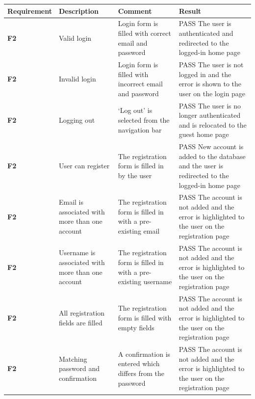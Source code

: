 \begin{longtabu} to \textwidth {XXXX}
\hline
Requirement & Description & Comment & Result \\ 
\hline
\textbf{F2} & Valid login & Login form is filled with correct email and password & \textcolor{passgreen}{PASS} The user is authenticated and redirected to the logged-in home page \vspace{2mm}\\
\textbf{F2} & Invalid login & Login form is filled with incorrect email and password & \textcolor{passgreen}{PASS} The user is not logged in and the error is shown to the user on the login page \vspace{2mm}\\
\textbf{F2} & Logging out & `Log out' is selected from the navigation bar & \textcolor{passgreen}{PASS} The user is no longer authenticated and is relocated to the guest home page \vspace{2mm}\\
\textbf{F2} & User can register & The registration form is filled in by the user & \textcolor{passgreen}{PASS} New account is added to the database and the user is redirected to the logged-in home page \vspace{2mm}\\
\textbf{F2} & Email is associated with more than one account & The registration form is filled in with a pre-existing email & \textcolor{passgreen}{PASS} The account is not added and the error is highlighted to the user on the registration page \vspace{2mm}\\
\textbf{F2} & Username is associated with more than one account & The registration form is filled in with a pre-existing username & \textcolor{passgreen}{PASS} The account is not added and the error is highlighted to the user on the registration page \vspace{2mm}\\
\textbf{F2} & All registration fields are filled & The registration form is filled with empty fields & \textcolor{passgreen}{PASS} The account is not added and the error is highlighted to the user on the registration page \vspace{2mm}\\
\textbf{F2} & Matching password and confirmation & A confirmation is entered which differs from the password & \textcolor{passgreen}{PASS} The account is not added and the error is highlighted to the user on the registration page \vspace{2mm}\\

\end{longtabu}
